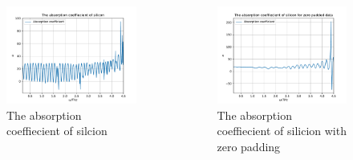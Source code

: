 \documentclass[aspectratio=1610, 9pt]{beamer}
\begin{document}
\begin{frame}
  \begin{center}
    \begin{columns}
      \begin{column}{0.5\textwidth}
        \begin{figure}
        \includegraphics[width=\textwidth]{silicon/THz_absorption.pdf}
        \caption{The absorption coeffiecient of silcion}
        \end{figure}
      \end{column}
      \begin{column}{0.5\textwidth}
        \begin{figure}
        \includegraphics[width=\textwidth]{silicon/THz_absorption_zero.pdf}
        \caption{The absorption coeffiecient of silicion with zero padding}
        \end{figure}
      \end{column}
    \end{columns}
  \end{center}
\end{frame}
\end{document}
